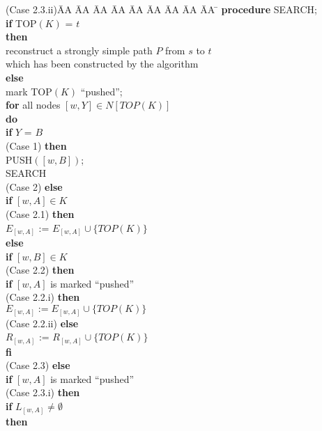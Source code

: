 \documentclass[12pt,twoside,a4paper]{article}
\begin{document}
\begin{tabbing}
(Case 2.3.ii)\= AA \= AA \= AA \= AA \= AA \= AA \= AA \= AA \= AA \= \kill
\> {\bf procedure} SEARCH; \\
\> {\bf if} TOP$(K)$ = $t$ \\
\> {\bf then} \\
\> \> reconstruct a strongly simple path $P$ from $s$ to $t$ \\
\> \> which has been constructed by the algorithm \\
\> {\bf else} \\
\> \> mark TOP$(K)$ ``pushed''; \\
\> \> {\bf for} all nodes $[w,Y] \in N[TOP(K)]$ \\
\> \> {\bf do} \\
\> \> \> {\bf if} $Y$ = $B$ \\
(Case 1) \> \> \> {\bf then} \\
\> \> \> \> PUSH$([w,B])$; \\
\> \> \> \> SEARCH \\
(Case 2) \> \> \> {\bf else} \\
\> \> \> \> {\bf if} $[w,A] \in K$ \\
(Case 2.1) \> \> \> \> {\bf then} \\
\> \> \> \> \> $E_{[w,A]}$ := $E_{[w,A]}\cup \{TOP(K)\}$ \\
\> \> \> \> {\bf else} \\
\> \> \> \> \> {\bf if} $[w,B] \in K$ \\
(Case 2.2) \> \> \> \> \> {\bf then} \\
\> \> \> \> \> \> {\bf if} $[w,A]$ is marked ``pushed'' \\
(Case 2.2.i) \> \> \> \> \> \> {\bf then} \\
\> \> \> \> \> \> \> $E_{[w,A]} := E_{[w,A]}\cup \{TOP(K)\}$ \\
(Case 2.2.ii) \> \> \> \> \> \> {\bf else} \\
\> \> \> \> \> \> \> $R_{[w,A]}$ := $R_{[w,A]} \cup \{TOP(K)\}$ \\
\> \> \> \> \> \> {\bf fi} \\
(Case 2.3) \> \> \> \> \> {\bf else} \\
\> \> \> \> \> \> {\bf if} $[w,A]$ is marked ``pushed'' \\ 
(Case 2.3.i) \> \> \> \> \> \> {\bf then}\\
\> \> \> \> \> \> \> {\bf if} $L_{[w,A]} \not= \emptyset$ \\
\> \> \> \> \> \> \> {\bf then} \\

\end{tabbing}
\end{document}

